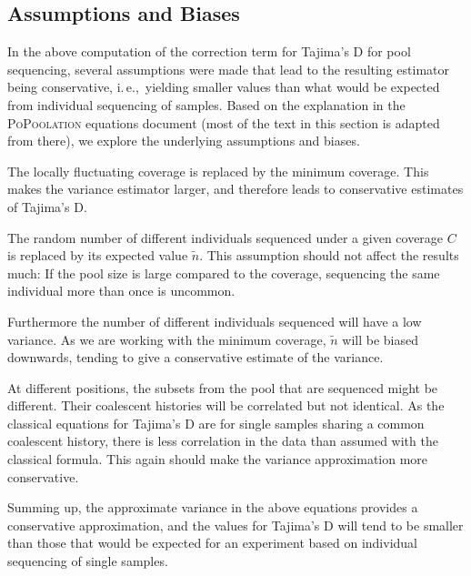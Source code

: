 \documentclass[letterpaper,fontsize=9pt,DIV=12]{scrartcl}
\newcommand\toolname{\textsc}
\newcommand{\ie}{i.\,e.,~}
\begin{document}

\subsection{Assumptions and Biases}
\label{supp:sec:TajimaD:sub:AssumptionsBiases}

In the above computation of the correction term for Tajima's D for pool sequencing,
several assumptions were made that lead to the resulting estimator being conservative,
\ie yielding smaller values than what would be expected from individual sequencing of samples.
Based on the explanation in the \toolname{PoPoolation} equations document (most of the text in this section is adapted from there), we explore the underlying assumptions and biases.

The locally fluctuating coverage is replaced by the minimum coverage.
This makes the variance estimator larger, and therefore leads to conservative estimates of Tajima's D.

The random number of different individuals sequenced under a given coverage $C$
is replaced by its expected value $\tilde{n}$.
This assumption should not affect the results much:
If the pool size is large compared to the coverage, sequencing the same individual more than once is uncommon.

Furthermore the number of different individuals sequenced will have a low variance.
As we are working with the minimum coverage, $\tilde{n}$ will be biased downwards,
tending to give a conservative estimate of the variance.

At different positions, the subsets from the pool that are sequenced might be different.
Their coalescent histories will be correlated but not identical.
As the classical equations for Tajima's D are for single samples sharing a common coalescent history,
there is less correlation in the data than assumed with the classical formula.
This again should make the variance approximation more conservative.

Summing up, the approximate variance in the above equations provides a conservative approximation,
and the values for Tajima's D will tend to be smaller than those that would be expected
for an experiment based on individual sequencing of single samples.
\end{document}
